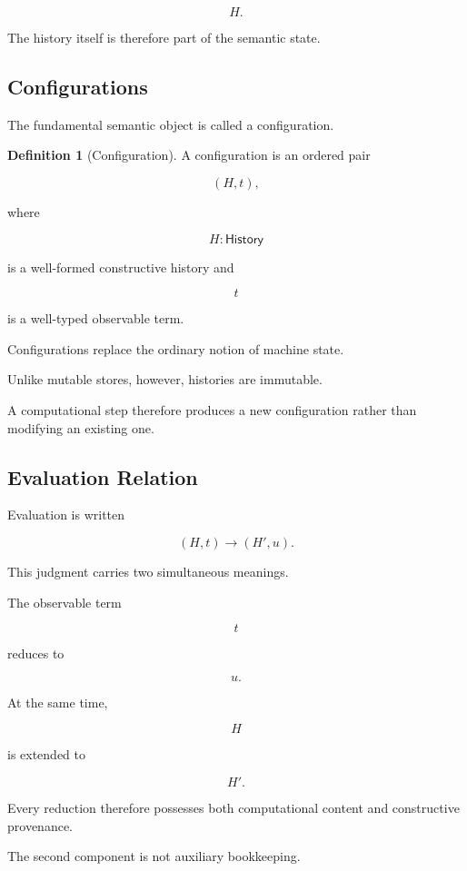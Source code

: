 \documentclass[12pt,oneside]{article}
\theoremstyle{definition}
\newtheorem{definition}[theorem]{Definition}
\theoremstyle{remark}
\begin{document}
\[
H.
\]

The history itself is therefore part of the semantic state.

\subsection{Configurations}

The fundamental semantic object is called a configuration.

\begin{definition}[Configuration]

A configuration is an ordered pair

\[
(H,t),
\]

where

\[
H
:
\mathsf{History}
\]

is a well-formed constructive history and

\[
t
\]

is a well-typed observable term.

\end{definition}

Configurations replace the ordinary notion of machine state.

Unlike mutable stores, however, histories are immutable.

A computational step therefore produces a new configuration rather than
modifying an existing one.

\subsection{Evaluation Relation}

Evaluation is written

\[
(H,t)
\longrightarrow
(H',u).
\]

This judgment carries two simultaneous meanings.

The observable term

\[
t
\]

reduces to

\[
u.
\]

At the same time,

\[
H
\]

is extended to

\[
H'.
\]

Every reduction therefore possesses both computational content and constructive
provenance.

The second component is not auxiliary bookkeeping.
\end{document}
